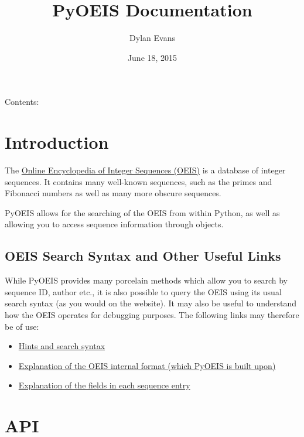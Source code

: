 \documentclass[letterpaper,10pt,english]{sphinxmanual}
\title{PyOEIS Documentation}
\date{June 18, 2015}
\author{Dylan Evans}
\begin{document}
\maketitle
\tableofcontents
{}\label{index::doc}


Contents:


\chapter{Introduction}
\label{introduction:introduction}\label{introduction::doc}\label{introduction:welcome-to-pyoeis-s-documentation}
The \href{http://www.oeis.org}{Online Encyclopedia of Integer Sequences (OEIS)} is
a database of integer sequences. It contains many well-known sequences, such as
the primes and Fibonacci numbers as well as many more obscure sequences.

PyOEIS allows for the searching of the OEIS from within Python, as well as
allowing you to access sequence information through
{\hyperref[api:sequence.Sequence]{\emph{}}} objects.


\section{OEIS Search Syntax and Other Useful Links}
\label{introduction:oeis-search-syntax-and-other-useful-links}
While PyOEIS provides many porcelain methods which allow you to search by
sequence ID, author etc., it is also possible to query the OEIS using its
usual search syntax (as you would on the website). It may also be useful to
understand how the OEIS operates for debugging purposes. The following links
may therefore be of use:
\begin{itemize}
\item {} 
\href{http://oeis.org/hints.html}{Hints and search syntax}

\item {} 
\href{http://oeis.org/eishelp1.html}{Explanation of the OEIS internal format (which PyOEIS is built upon)}

\item {} 
\href{http://oeis.org/eishelp2.html}{Explanation of the fields in each sequence entry}

\end{itemize}


\chapter{API}
\label{api:api}\label{api::doc}
\end{document}
